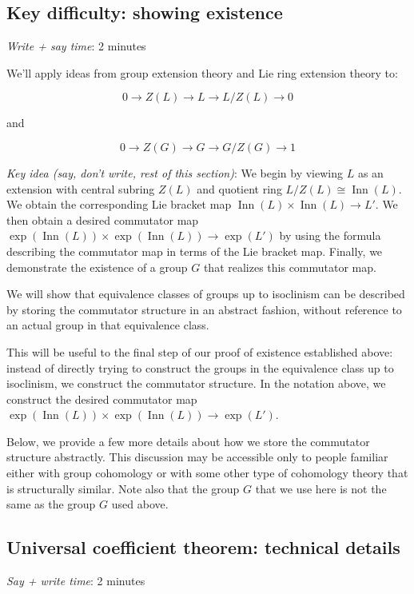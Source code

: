 \documentclass[10pt]{amsart}
\begin{document}
\subsection{Key difficulty: showing existence}

{\em Write + say time}: 2 minutes

We'll apply ideas from group extension theory and Lie ring extension
theory to:

$$0 \to Z(L) \to L \to L/Z(L) \to 0$$

and

$$0 \to Z(G) \to G \to G/Z(G) \to 1$$

{\em Key idea (say, don't write, rest of this section)}: We begin by
viewing $L$ as an extension with central subring $Z(L)$ and quotient
ring $L/Z(L) \cong \operatorname{Inn}(L)$. We obtain the corresponding
Lie bracket map $\operatorname{Inn}(L) \times \operatorname{Inn}(L)
\to L'$. We then obtain a desired commutator map
$\exp(\operatorname{Inn}(L)) \times \exp(\operatorname{Inn}(L)) \to
\exp(L')$ by using the formula describing the commutator map in terms
of the Lie bracket map. Finally, we demonstrate the existence of a
group $G$ that realizes this commutator map.

We will show that equivalence classes of groups up to isoclinism can
be described by storing the commutator structure in an abstract
fashion, without reference to an actual group in that equivalence
class.

This will be useful to the final step of our proof of existence
established above: instead of directly trying to construct the groups
in the equivalence class up to isoclinism, we construct the commutator
structure. In the notation above, we construct the desired commutator
map $\exp(\operatorname{Inn}(L)) \times \exp(\operatorname{Inn}(L))
\to \exp(L')$.

Below, we provide a few more details about how we store the commutator
structure abstractly. This discussion may be accessible only to people
familiar either with group cohomology or with some other type of
cohomology theory that is structurally similar. Note also that the
group $G$ that we use here is not the same as the group $G$ used above.

\subsection{Universal coefficient theorem: technical details}

{\em Say + write time}: 2 minutes
\end{document}
